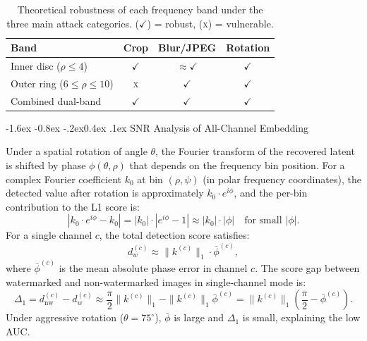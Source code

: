\documentclass[10pt,twocolumn]{article}
\makeatletter
\renewcommand\subsection{\@startsection{subsection}{2}{\z@}%
  {-1.6ex \@plus -0.8ex \@minus -.2ex}{0.4ex \@plus .1ex}%
  {\normalfont\normalsize\itshape}}
\makeatother
\begin{document}
\begin{table}[htbp]
  \centering
  \caption{Theoretical robustness of each frequency band
    under the three main attack categories.
    ($\checkmark$) = robust, (\textsc{x}) = vulnerable.}
  \label{tab:band_theory}
  \setlength{\tabcolsep}{4pt}
  \small
  \begin{tabular}{lccc}
    \toprule
    \textbf{Band} & \textbf{Crop} & \textbf{Blur/JPEG} & \textbf{Rotation} \\
    \midrule
    Inner disc ($\rho \le 4$)           & $\checkmark$ & $\approx\checkmark$ & $\checkmark$ \\
    Outer ring ($6 \le \rho \le 10$)    & \textsc{x}   & $\checkmark$ & $\checkmark$ \\
    Combined dual-band                  & $\checkmark$ & $\checkmark$ & $\checkmark$ \\
    \bottomrule
  \end{tabular}
\end{table}

\subsection{SNR Analysis of All-Channel Embedding}

Under a spatial rotation of angle $\theta$, the Fourier transform of
the recovered latent is shifted by phase $\phi(\theta, \rho)$ that
depends on the frequency bin position.
For a complex Fourier coefficient $k_0$ at bin $(\rho, \psi)$
(in polar frequency coordinates), the detected value after rotation is
approximately $k_0 \cdot e^{i\phi}$, and the per-bin contribution to
the L1 score is:
\begin{equation}
  |k_0 \cdot e^{i\phi} - k_0| = |k_0| \cdot |e^{i\phi} - 1|
    \approx |k_0| \cdot |\phi|
  \quad\text{for small }|\phi|.
\end{equation}
For a single channel $c$, the total detection score satisfies:
\begin{equation}
  d_w^{(c)} \approx \|k^{(c)}\|_1 \cdot \bar\phi^{(c)},
\end{equation}
where $\bar\phi^{(c)}$ is the mean absolute phase error in channel $c$.
The score gap between watermarked and non-watermarked images in
single-channel mode is:
\begin{equation}
  \Delta_1 = d_{\mathrm{nw}}^{(c)} - d_w^{(c)}
    \approx \frac{\pi}{2}\|k^{(c)}\|_1 - \|k^{(c)}\|_1 \bar\phi^{(c)}
    = \|k^{(c)}\|_1 \left(\frac{\pi}{2} - \bar\phi^{(c)}\right).
\end{equation}
Under aggressive rotation ($\theta{=}75^\circ$), $\bar\phi$ is large
and $\Delta_1$ is small, explaining the low AUC.
\end{document}
